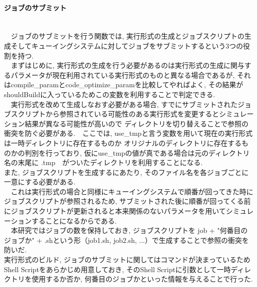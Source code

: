 \paragraph{ジョブのサブミット}~\\
　ジョブのサブミットを行う関数では, 実行形式の生成とジョブスクリプトの生成そしてキューイングシステムに対してジョブをサブミットするという3つの役割を持つ.\\
　まずはじめに, 実行形式の生成を行う必要があるのは実行形式の生成に関与するパラメータが現在利用されている実行形式のものと異なる場合であるが,
それはcompile\_paramとcode\_optimize\_paramを比較してやればよく, その結果がshouldBuildに入っているためこの変数を利用することで判定できる.\\
　実行形式を改めて生成しなおす必要がある場合, すでにサブミットされたジョブスクリプトから参照されている可能性のある実行形式を変更するとシミュレーション結果が異なる可能性が高いので
ディレクトリを切り替えることで参照の衝突を防ぐ必要がある.　ここでは, use\_tmpと言う変数を用いて現在の実行形式は一時ディレクトリに存在するものか
オリジナルのディレクトリに存在するものかの判別を行っており, 仮にuse\_tmpの値が真である場合は元のディレクトリ名の末尾に .tmp　がついたディレクトリを利用することになる.\\

また, ジョブスクリプトを生成するにあたり, そのファイル名を各ジョブごとに一意にする必要がある.\\
　これは実行形式の場合と同様にキューイングシステムで順番が回ってきた時にジョブスクリプトが参照されるため,
サブミットされた後に順番が回ってくる前にジョブスクリプトが更新されると本来関係のないパラメータを用いてシミュレーションすることになるからである.\\
　本研究ではジョブの数を保持しておき, ジョブスクリプトを job + "何番目のジョブか" + .shという形（job1.sh, job2.sh, ...）で生成することで参照の衝突を防いだ.\\

実行形式のビルド, ジョブのサブミットに関してはコマンドが決まっているためShell Scriptをあらかじめ用意しておき,
そのShell Scriptに引数として一時ディレクトリを使用するか否か, 何番目のジョブかといった情報を与えることで行った.\\

